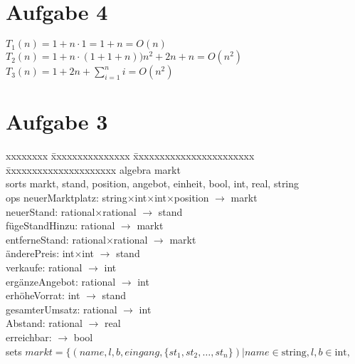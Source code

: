 \documentclass[12pt, twoside]{article}
\newcommand{\M}{$\times$}
\begin{document}
\newpage

\section{Aufgabe 4}
$T_1(n) = 1+n \cdot 1 = 1 + n = O(n)$ \\
$T_2(n) = 1 + n \cdot (1+1+n) ) n^2+2n+n = O(n^2)$ \\
$T_3(n) = 1 + 2n + \sum_{i=1}^{n}i = O(n^2)$ 

\section{Aufgabe 3}
\begin{tabbing}
xxxxxxxx \= xxxxxxxxxxxxxxx \= xxxxxxxxxxxxxxxxxxxxxxx       \=   xxxxxxxxxxxxxxxxxxxxx  \kill
algebra  \> markt        \\
sorts    \> markt, stand, position, angebot, einheit, bool, int, real, string                             \\
ops      \> neuerMarktplatz:\> string\M int\M int\M position \> $\rightarrow$ markt        \\
         \> neuerStand:     \> rational$\times$rational   \> $\rightarrow$ stand        \\
         \> fügeStandHinzu: \> rational                   \> $\rightarrow$ markt        \\
         \> entferneStand:  \> rational$\times$rational   \> $\rightarrow$ markt        \\
         \> änderePreis:    \> int$\times$int             \> $\rightarrow$ stand        \\
         \> verkaufe:       \> rational                   \> $\rightarrow$ int          \\
         \> ergänzeAngebot: \> rational                   \> $\rightarrow$ int          \\
         \> erhöheVorrat:   \> int                        \> $\rightarrow$ stand        \\
         \> gesamterUmsatz: \> rational                   \> $\rightarrow$ int          \\
         \> Abstand:        \> rational                   \> $\rightarrow$ real         \\
         \> erreichbar:     \> \>$\rightarrow$ bool \\
sets     \> $markt = \{(name, l, b, eingang, \{st_1, st_2,\dots,st_n\}) | name \in \text{string}, l, b \in \text{int},$ \\

\end{tabbing}
\end{document}
